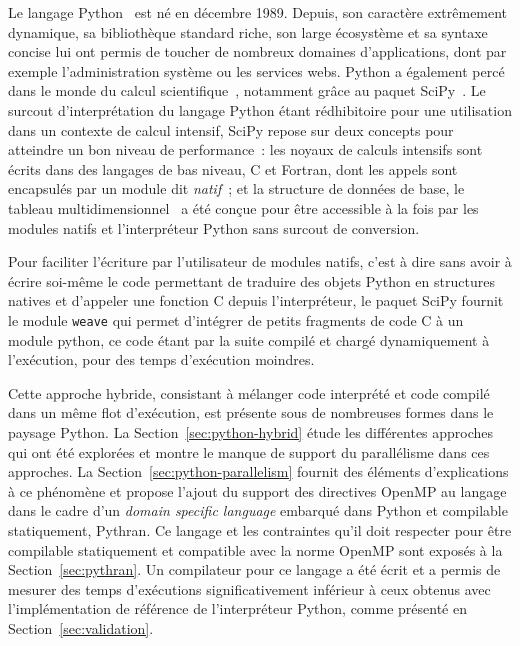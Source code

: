\documentclass[renpar]{compas2013}
\begin{document}
Le langage Python~\cite{rossum97} est né en décembre 1989. Depuis, son
caractère extrêmement dynamique, sa bibliothèque standard riche, son large
écosystème et sa syntaxe concise lui ont permis de toucher de nombreux
domaines d'applications, dont par exemple l'administration système ou les
services webs.  Python a également percé dans le monde du calcul
scientifique~\cite{Oliphant2007}, notamment grâce au paquet
SciPy~\cite{scipy}. Le surcout d'interprétation du langage Python étant
rédhibitoire pour une utilisation dans un contexte de calcul intensif,
SciPy repose sur deux concepts pour atteindre un bon niveau de
performance~: les noyaux de calculs intensifs sont écrits dans des
langages de bas niveau, C et Fortran, dont les appels sont encapsulés par
un module dit \emph{natif}~; et la structure de données de base, le
tableau multidimensionnel~\cite{numpyarray2011} a été conçue pour être
accessible à la fois par les modules natifs et l'interpréteur Python sans
surcout de conversion.

Pour faciliter l'écriture par l'utilisateur de modules natifs, c'est à
dire sans avoir à écrire soi-même le code permettant de traduire des
objets Python en structures natives et d'appeler une fonction C depuis
l'interpréteur, le paquet SciPy fournit le module \texttt{weave} qui
permet d'intégrer de petits fragments de code C à un module python, ce
code étant par la suite compilé et chargé dynamiquement à l'exécution,
pour des temps d'exécution moindres.

Cette approche hybride, consistant à mélanger code interprété et code
compilé dans un même flot d'exécution, est présente sous de nombreuses
formes dans le paysage Python. La Section~\ref{sec:python-hybrid} étude
les différentes approches qui ont été explorées et montre le manque de
support du parallélisme dans ces approches. La
Section~\ref{sec:python-parallelism} fournit des éléments d'explications à
ce phénomène et propose l'ajout du support des directives OpenMP au langage
dans le cadre d'un \emph{domain specific language} embarqué dans Python et
compilable statiquement, Pythran. Ce langage et les contraintes qu'il doit
respecter pour être compilable statiquement et compatible avec la norme
OpenMP sont exposés à la Section~\ref{sec:pythran}. Un compilateur pour ce
langage a été écrit et a permis de mesurer des temps d'exécutions
significativement inférieur à ceux obtenus avec l'implémentation de
référence de l'interpréteur Python, comme présenté en
Section~\ref{sec:validation}.

\end{document}
